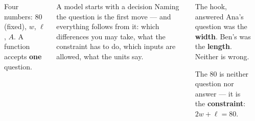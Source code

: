 \documentclass[aspectratio=169, 11pt]{beamer}
\begin{document}
\begin{frame}[t, plain]

  \begin{columns}[T, onlytextwidth]
      \begin{center}
      \end{center}

      \smallskip
      Four numbers: \(80\) (fixed), \(w\), \(\ell\), \(A\). A function accepts
      \textbf{one} question.

      \begin{block}{A model starts with a decision}
        Naming the question is the first move --- and everything follows from
        it: which differences you may take, what the constraint has to do,
        which inputs are allowed, what the units say.
      \end{block}

      \medskip
      \begin{block}{The hook, answered}
        Ana's question was the \textbf{width}. Ben's was the
        \textbf{length}. Neither is wrong.

        \smallskip
        The 80 is neither question nor answer --- it is the
        \textbf{constraint}: \(2w + \ell = 80\).
      \end{block}
  \end{columns}
\end{frame}
\end{document}
